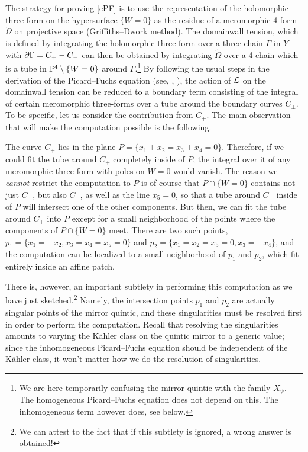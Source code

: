 The strategy for proving \eqref{ePF} is to use the representation of
the holomorphic three-form on the hypersurface $\{W=0\}$ as 
the residue of a meromorphic 4-form $\tilde \Omega$ on projective space 
(Griffiths--Dwork method). The domainwall tension, which is defined by 
integrating the holomorphic three-form over a three-chain $\Gamma$ in 
$Y$ with $\partial\Gamma=C_+-C_-$ can then be obtained by integrating 
$\tilde\Omega$ over a 4-chain which is a tube in ${\mathbb P}^4\setminus 
\{W=0\}$ around $\Gamma$.\footnote{We are here temporarily confusing 
the mirror quintic with the family $X_\psi$.
The homogeneous Picard--Fuchs equation does not depend on this. The 
inhomogeneous term however does, see below.} By following the usual 
steps in the derivation of the Picard--Fuchs equation (see, \eg, 
\cite{guide}), the action of ${\cal L}$ on the domainwall tension can be 
reduced to a boundary term consisting of the integral of certain 
meromorphic three-forms over a tube around the boundary curves $C_\pm$. 
To be specific, let us consider the contribution from $C_+$. The main 
observation that will make the computation possible is the following. 

The curve $C_+$ lies in the plane $P=\{x_1+x_2=x_3+x_4=0\}$. Therefore,
if we could fit the tube around $C_+$ completely inside of $P$, 
the integral over it of any meromorphic three-form with poles on $W=0$ 
would vanish. The reason we {\it cannot} restrict the computation to 
$P$ is of course that $P\cap\{W=0\}$ contains not just $C_+$, but also 
$C_-$, as well as the line $x_5=0$, so that a tube around $C_+$ inside of $P$
will intersect one of the other components. But then, we can fit the tube
around $C_+$ into $P$ except for a small neighborhood of the points
where the components of $P\cap\{W=0\}$ meet. There are two such points,
$p_1=\{x_1=-x_2,x_3=x_4=x_5=0\}$ and $p_2=\{x_1=x_2=x_5=0,x_3=-x_4\}$,
and the computation can be localized to a small neighborhood of $p_1$
and $p_2$, which fit entirely inside an affine patch.

There is, however, an important subtlety in performing this computation
as we have just sketched.\footnote{We can attest to the fact that if this 
subtlety is ignored, a wrong answer is obtained!}  Namely, the intersection 
points $p_1$ and $p_2$ are actually singular points of the mirror quintic, 
and these singularities must be resolved first in order to perform the
computation. Recall that resolving the singularities amounts to varying 
the K\"ahler class on the quintic mirror to a generic value; since the 
inhomogeneous Picard--Fuchs equation should be independent of the K\"ahler 
class, it won't matter how we do the resolution of singularities.


